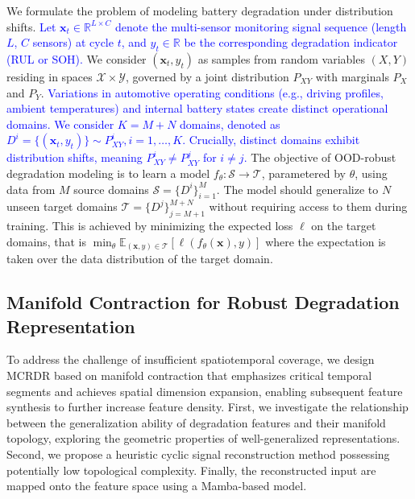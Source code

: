 \documentclass[lettersize,journal]{IEEEtran}
\newcommand{\rev}[1]{\textcolor{blue}{#1}}
\begin{document}
We formulate the problem of modeling battery degradation under distribution shifts. \rev{Let $\boldsymbol{x}_{t} \in \mathbb{R}^{L \times C}$ denote the multi-sensor monitoring signal sequence (length $L$, $C$ sensors) at cycle $t$, and $y_{t} \in \mathbb{R}$ be the corresponding degradation indicator (RUL or SOH).} We consider $(\boldsymbol{x}_{t}, y_{t})$ as samples from random variables $(X, Y)$ residing in spaces $\mathcal{X} \times \mathcal{Y}$, governed by a joint distribution $P_{XY}$ with marginals $P_{X}$ and $P_{Y}$.
% 
\rev{Variations in automotive operating conditions (e.g., driving profiles, ambient temperatures) and internal battery states create distinct operational domains. We consider $K = M + N$ domains, denoted as $D^{i} = \{ (\boldsymbol{x}_{t}, y_{t}) \} \sim P_{XY}^{i}, i = 1, \dots, K$. Crucially, distinct domains exhibit distribution shifts, meaning $P^{i}_{XY} \neq P^{j}_{XY}$ for $i \neq j$.}
% 
The objective of OOD-robust degradation modeling is to learn a  model $f_{\theta}: \mathcal{S} \to \mathcal{T}$, parametered by $\theta$, using data from $M$ source domains $\mathcal{S} = \{ D^{i} \}_{i=1}^{M}$.
% 
The model should generalize to $N$ unseen target domains $\mathcal{T} = \{ D^{j} \}_{j=M+1}^{M+N}$ without requiring access to them during training. This is achieved by minimizing the expected loss $\ell$ on the target domains, that is $\mathop{\min}_{\theta}\mathbb{E}_{(\boldsymbol{x}, y) \in \mathcal{T}} [\ell(f_{\theta}(\boldsymbol{x}), y)]$ where the expectation is taken over the data distribution of the target domain.

\subsection{Manifold Contraction for Robust Degradation Representation}

To address the challenge of insufficient spatiotemporal coverage, we design MCRDR based on manifold contraction that emphasizes critical temporal segments and achieves spatial dimension expansion, enabling subsequent feature synthesis to further increase feature density.
First, we investigate the relationship between the generalization ability of degradation features and their manifold topology, exploring the geometric properties of well-generalized representations.
Second, we propose a heuristic cyclic signal reconstruction method possessing potentially low topological complexity.
Finally, the reconstructed input are mapped onto the feature space using a Mamba-based model.
\end{document}
